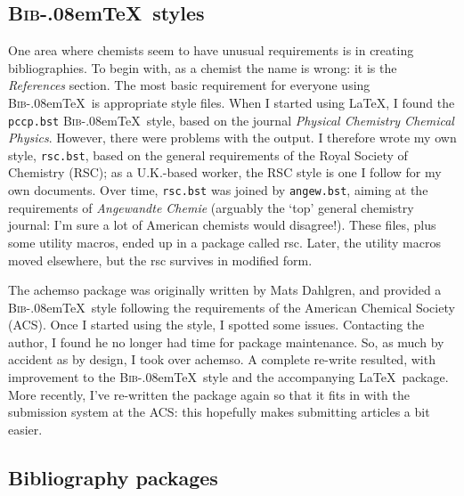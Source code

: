 \documentclass{article}
\providecommand*\acro[1]{\textsc{#1}}
\providecommand*\BibTeX{\acro{Bib}\kern-.08em\relax\TeX}
\providecommand*\file[1]{\texttt{#1}}
\providecommand*\pkg[1]{\textsf{#1}}
\begin{document}
\subsection{\BibTeX\ styles}

One area where chemists seem to have unusual requirements is in
creating bibliographies.  To begin with, as a chemist the name
is wrong: it is the \emph{References} section.  The most basic
requirement for everyone using \BibTeX\ is appropriate style
files.  When I started using \LaTeX, I found the
\file{pccp.bst} \BibTeX\ style, based on the journal
\emph{Physical Chemistry Chemical Physics}.  However, there
were problems with the output.  I therefore wrote my own style,
\file{rsc.bst}, based on the general requirements of the Royal
Society of Chemistry (\acro{RSC}); as a U.K.-based worker, the
\acro{RSC} style is one I follow for my own documents.  Over
time, \file{rsc.bst} was joined by \file{angew.bst}, aiming at
the requirements of \emph{Angewandte Chemie} (arguably the
`top' general chemistry journal: I'm sure a lot of American
chemists would disagree!). These files, plus some utility
macros, ended up in a package called \pkg{rsc}. Later, the
utility macros moved elsewhere, but the \pkg{rsc} survives in
modified form.

The \pkg{achemso} package was originally written by Mats
Dahlgren, and provided a \BibTeX\ style following the
requirements of the American Chemical Society (\acro{ACS}).
Once I started using the style, I spotted some issues.
Contacting the author, I found he no longer had time for
package maintenance.  So, as much by accident as by design, I
took over \pkg{achemso}.  A complete re-write resulted, with
improvement to the \BibTeX\ style and the accompanying \LaTeX\
package. More recently, I've re-written the package again so that
it fits in with the submission system at the \acro{ACS}: this
hopefully makes submitting articles a bit easier. 

\subsection{Bibliography packages}
\end{document}
